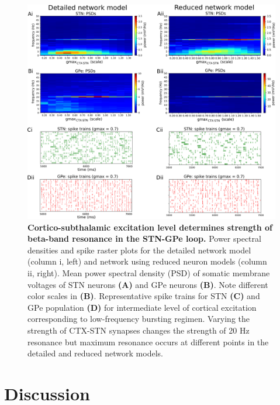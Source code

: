 %
%
%
%
%

\begin{figure}[ht]
\centering
\includegraphics[width=\textwidth]{ch_reduced_model/figs/fig_net-full-vs-red_sweep-g-ctx-stn_f-burst-20.png}
\caption{
\textbf{Cortico-subthalamic excitation level determines strength of beta-band resonance in the STN-GPe loop.}
Power spectral densities and spike raster plots for the detailed network model (column i, left) and network using reduced neuron models (column ii, right). Mean power spectral density (PSD) of somatic membrane voltages of STN neurons \textbf{(A)} and GPe neurons \textbf{(B)}. Note different color scales in \textbf{(B)}. Representative spike trains for STN \textbf{(C)} and GPe population \textbf{(D)} for intermediate level of cortical excitation corresponding to low-frequency bursting regimen. Varying the strength of CTX-STN synapses changes the strength of 20 Hz resonance but maximum resonance occurs at different points in the detailed and reduced network models.
}
\label{fig:net-full-vs-red_ctx-burst_sweep-g-ctx-stn}
\end{figure}

%
%
%
\section{Discussion}
%
%
%
%
%
%
%
%
%
%
%
%
%
%

%
%
%
%
%
%

%
%
%
%
%
%


